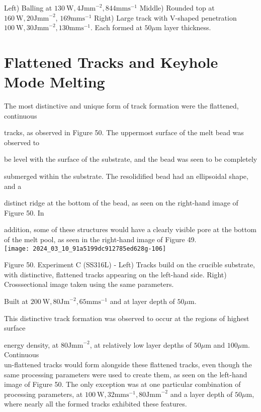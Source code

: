\documentclass[10pt]{article}
\begin{document}
Left) Balling at $130 \mathrm{~W}, 4 \mathrm{Jmm}^{-2}, 844 \mathrm{mms}^{-1}$ Middle) Rounded top at $160 \mathrm{~W}, 20 \mathrm{Jmm}^{-2}$, $169 \mathrm{mms}^{-1}$ Right) Large track with V-shaped penetration $100 \mathrm{~W}, 30 \mathrm{Jmm}^{-2}, 130 \mathrm{mms}^{-1}$. Each formed at $50 \mu \mathrm{m}$ layer thickness.

\section*{Flattened Tracks and Keyhole Mode Melting}
The most distinctive and unique form of track formation were the flattened, continuous

tracks, as observed in Figure 50. The uppermost surface of the melt bead was observed to

be level with the surface of the substrate, and the bead was seen to be completely

submerged within the substrate. The resolidified bead had an ellipsoidal shape, and a

distinct ridge at the bottom of the bead, as seen on the right-hand image of Figure 50. In

addition, some of these structures would have a clearly visible pore at the bottom of the melt pool, as seen in the right-hand image of Figure 49.\\
\texttt{[image: 2024\_03\_10\_91a5199dc912785ed628g-106]}

Figure 50. Experiment C (SS316L) - Left) Tracks build on the crucible substrate, with distinctive, flattened tracks appearing on the left-hand side. Right) Crosssectional image taken using the same parameters.

Built at $200 \mathrm{~W}, 80 \mathrm{Jm}^{-2}, 65 \mathrm{mms}^{-1}$ and at layer depth of $50 \mu \mathrm{m}$.

This distinctive track formation was observed to occur at the regions of highest surface

energy density, at $80 \mathrm{Jmm}^{-2}$, at relatively low layer depths of $50 \mu \mathrm{m}$ and $100 \mu \mathrm{m}$. Continuous\\
un-flattened tracks would form alongside these flattened tracks, even though the same processing parameters were used to create them, as seen on the left-hand image of Figure 50. The only exception was at one particular combination of processing parameters, at $100 \mathrm{~W}, 32 \mathrm{mms}^{-1}, 80 \mathrm{Jmm}^{-2}$ and a layer depth of $50 \mu \mathrm{m}$, where nearly all the formed tracks exhibited these features.
\end{document}
